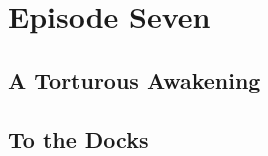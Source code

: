 \documentclass[././main.tex]{subfiles}
\begin{document}
\section{Episode Seven}
\subsection{A Torturous Awakening}
\subsection{To the Docks}
\end{document}
